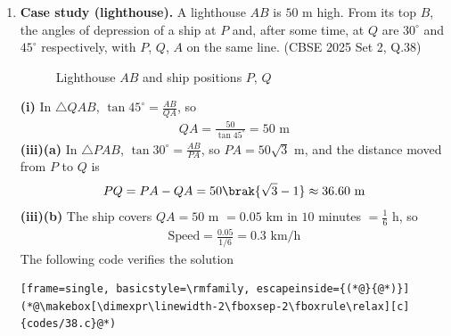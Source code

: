 \begin{enumerate}[label=\thesubsection.\arabic*, ref=\thesubsection.\theenumi]
\solution
\textbf{(i)} The highest frequency is $7$, so the modal class is $600$--$800$ mm.

\textbf{(ii)} Here $N = 24$ and $\frac{N}{2} = 12$. The cumulative frequencies are $3, 7, 14, 18, 21, 24$, so the median class is $600$--$800$ with $l = 600$, $cf = 7$, $f = 7$, $h = 200$:
\begin{align}
	\text{Median} = l + \frac{\frac{N}{2} - cf}{f}\times h = 600 + \frac{12-7}{7}\times 200 \approx 742.86 \text{ mm}
\end{align}
For the mean, with class marks $x_i = 300, 500, \dots, 1300$,
\begin{align}
	\bar{x} = \frac{\sum f_i x_i}{\sum f_i} = \frac{18600}{24} = 775 \text{ mm}
\end{align}
\textbf{(iii)} The classes from $800$ mm upward have $4 + 3 + 3 = 10$ subdivisions.

The following code verifies the solution
\begin{lstlisting}[frame=single, basicstyle=\rmfamily, escapeinside={(*@}{@*)}]
(*@\makebox[\dimexpr\linewidth-2\fboxsep-2\fboxrule\relax][c]{codes/36.c}@*)
\end{lstlisting}

\item
\textbf{Case study (lighthouse).} A lighthouse $AB$ is $50$ m high. From its top $B$, the angles of depression of a ship at $P$ and, after some time, at $Q$ are $30^\circ$ and $45^\circ$ respectively, with $P$, $Q$, $A$ on the same line.
\hfill (CBSE 2025 Set 2, Q.38)
\begin{figure}[H]
	\centering

	\caption{Lighthouse $AB$ and ship positions $P$, $Q$}
	\label{fig:CBSE25S2-q38}
\end{figure}

\solution
\textbf{(i)} In $\triangle QAB$, $\tan 45^\circ = \frac{AB}{QA}$, so
\begin{align}
	QA = \frac{50}{\tan 45^\circ} = 50 \text{ m}
\end{align}
\textbf{(iii)(a)} In $\triangle PAB$, $\tan 30^\circ = \frac{AB}{PA}$, so $PA = 50\sqrt{3}$ m, and the distance moved from $P$ to $Q$ is
\begin{align}
	PQ = PA - QA = 50\brak{\sqrt{3} - 1} \approx 36.60 \text{ m}
\end{align}
\textbf{(iii)(b)} The ship covers $QA = 50$ m $= 0.05$ km in $10$ minutes $= \frac{1}{6}$ h, so
\begin{align}
	\text{Speed} = \frac{0.05}{1/6} = 0.3 \text{ km/h}
\end{align}
The following code verifies the solution
\begin{lstlisting}[frame=single, basicstyle=\rmfamily, escapeinside={(*@}{@*)}]
(*@\makebox[\dimexpr\linewidth-2\fboxsep-2\fboxrule\relax][c]{codes/38.c}@*)
\end{lstlisting}

\end{enumerate}
